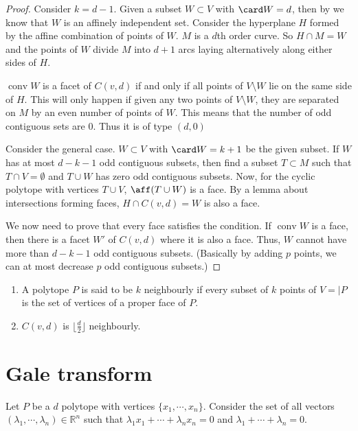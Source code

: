\documentclass[a4paper,10pt,landscape]{article}
\def\R{\mathbb{R}}
\def\conv{\operatorname{conv}}
\begin{document}
\begin{multicols}{3}
\begin{proof}
      Consider $k = d - 1$. Given a subset $W \subset V$ with $\card W = d$,
      then by we know that $W$ is an affinely independent set. Consider the
      hyperplane $H$ formed by the affine combination of points of $W$. $M$ is a
      $d$th order curve. So $H \cap M = W$ and the points of $W$ divide $M$ into
      $d + 1$ arcs laying alternatively along either sides of $H$.

      $\conv W$ is a facet of $C(v, d)$ if and only if all points of $V
      \setminus W$ lie on the same side of $H$. This will only happen if given
      any two points of $V \setminus W$, they are separated on $M$ by an even
      number of points of $W$. This means that the number of odd contiguous sets
      are $0$. Thus it is of type $(d, 0)$

      Consider the general case. $W \subset V$ with $\card W = k + 1$ be the
      given subset. If $W$ has at most $d - k - 1$ odd contiguous subsets, then
      find a subset $T \subset M$ such that $T \cap V = \emptyset$ and $T \cup
      W$ has zero odd contiguous subsets. Now, for the cyclic polytope with
      vertices $T \cup V$, $\aff (T \cup W)$ is a face. By a lemma about
      intersections forming faces, $H \cap C(v, d) = W$ is also a face.

      We now need to prove that every face satisfies the condition. If $\conv W$
      is a face, then there is a facet $W'$ of $C(v, d)$ where it is also a
      face. Thus, $W$ cannot have more than $d - k - 1$ odd contiguous subsets.
      (Basically by adding $p$ points, we can at most decrease $p$ odd
      contiguous subsets.)
    \end{proof}

    \begin{enumerate}
    \item A polytope $P$ is said to be $k$ neighbourly if every subset of $k$
      points of $V = \vert P$ is the set of vertices of a proper face of $P$.
    \item $C(v, d)$ is $\lfloor \frac{d}{2} \rfloor$ neighbourly.
    \end{enumerate}

    \section{Gale transform}
    Let $P$ be a $d$ polytope with vertices $\{x_1, \cdots, x_n\}$. Consider the
    set of all vectors $(\lambda_1, \cdots, \lambda_n) \in \R^n$ such that
    $\lambda_1 x_1 + \cdots + \lambda_n x_n = 0$ and $\lambda_1+ \cdots +
    \lambda_n = 0$.


\end{multicols}
\end{document}
